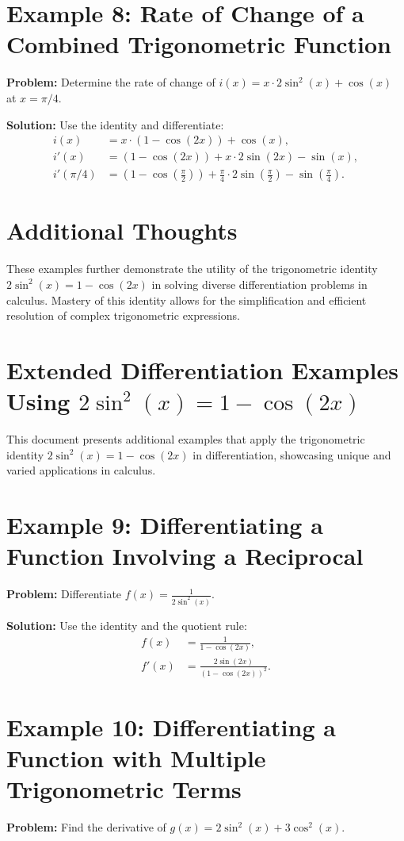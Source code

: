 \documentclass[a4paper,12pt]{book}
\newcounter{problem}
\newcounter{example}
\begin{document}
\section*{Example 8: Rate of Change of a Combined Trigonometric Function}
\textbf{Problem:} Determine the rate of change of \(i(x) = x \cdot 2 \sin^2(x) + \cos(x)\) at \(x = \pi/4\).

\textbf{Solution:}
Use the identity and differentiate:
\begin{align*}
i(x) &= x \cdot (1 - \cos(2x)) + \cos(x), \\
i'(x) &= (1 - \cos(2x)) + x \cdot 2 \sin(2x) - \sin(x), \\
i'(\pi/4) &= \left(1 - \cos\left(\frac{\pi}{2}\right)\right) + \frac{\pi}{4} \cdot 2 \sin\left(\frac{\pi}{2}\right) - \sin\left(\frac{\pi}{4}\right).
\end{align*}

\section*{Additional Thoughts}
These examples further demonstrate the utility of the trigonometric identity \(2 \sin^2(x) = 1 - \cos(2x)\) in solving diverse differentiation problems in calculus. Mastery of this identity allows for the simplification and efficient resolution of complex trigonometric expressions.

\section*{Extended Differentiation Examples Using \(2 \sin^2(x) = 1 - \cos(2x)\)}
This document presents additional examples that apply the trigonometric identity \(2 \sin^2(x) = 1 - \cos(2x)\) in differentiation, showcasing unique and varied applications in calculus.

\section*{Example 9: Differentiating a Function Involving a Reciprocal}
\textbf{Problem:} Differentiate \(f(x) = \frac{1}{2 \sin^2(x)}\).

\textbf{Solution:}
Use the identity and the quotient rule:
\begin{align*}
f(x) &= \frac{1}{1 - \cos(2x)}, \\
f'(x) &= \frac{2 \sin(2x)}{(1 - \cos(2x))^2}.
\end{align*}

\section*{Example 10: Differentiating a Function with Multiple Trigonometric Terms}
\textbf{Problem:} Find the derivative of \(g(x) = 2 \sin^2(x) + 3\cos^2(x)\).
\end{document}
